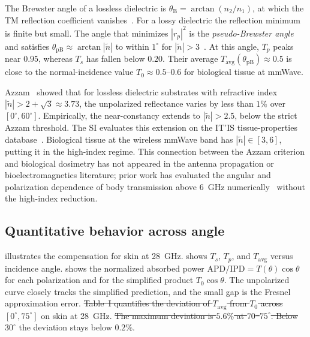 \documentclass[journal,twocolumn,10pt]{IEEEtran}
\newcommand{\IPD}{\mathrm{IPD}}
\newcommand{\APD}{\mathrm{APD}}
\newcommand{\Tavg}{T_{\mathrm{avg}}}
\newcommand{\ntilde}{\tilde{n}}
\providecommand{\DIFaddtex}[1]{{\protect\color{blue}\uwave{#1}}} %
\providecommand{\DIFdeltex}[1]{{\protect\color{red}\sout{#1}}}                      %
\providecommand{\DIFaddbegin}{} %
\providecommand{\DIFaddend}{} %
\providecommand{\DIFdelbegin}{} %
\providecommand{\DIFdelend}{} %
\providecommand{\DIFadd}[1]{\texorpdfstring{\DIFaddtex{#1}}{#1}} %
\providecommand{\DIFdel}[1]{\texorpdfstring{\DIFdeltex{#1}}{}} %
\newcommand{\DIFscaledelfig}{0.5}
\newlength{\DIFdelgraphicswidth} %
\newlength{\DIFdelgraphicsheight} %
\newcommand{\DIFaddincludegraphics}[2][]{{\color{blue}\fbox{\DIFOincludegraphics[#1]{#2}}}} %
\newcommand{\DIFdelincludegraphics}[2][]{%
\sbox{\DIFdelgraphicsbox}{\DIFOincludegraphics[#1]{#2}}%
\settoboxwidth{\DIFdelgraphicswidth}{\DIFdelgraphicsbox} %
\settoboxtotalheight{\DIFdelgraphicsheight}{\DIFdelgraphicsbox} %
\scalebox{\DIFscaledelfig}{%
\parbox[b]{\DIFdelgraphicswidth}{\usebox{\DIFdelgraphicsbox}\\[-\baselineskip] \rule{\DIFdelgraphicswidth}{0em}}\llap{\resizebox{\DIFdelgraphicswidth}{\DIFdelgraphicsheight}{%
\setlength{\unitlength}{\DIFdelgraphicswidth}%
\begin{picture}(1,1)%
\thicklines\linethickness{2pt} %
{\color[rgb]{1,0,0}\put(0,0){\framebox(1,1){}}}%
{\color[rgb]{1,0,0}\put(0,0){\line( 1,1){1}}}%
{\color[rgb]{1,0,0}\put(0,1){\line(1,-1){1}}}%
\end{picture}%
}\hspace*{3pt}}} %
} %
\DeclareRobustCommand{\DIFaddbegin}{\DIFOaddbegin \let\includegraphics\DIFaddincludegraphics} %
\DeclareRobustCommand{\DIFaddend}{\DIFOaddend \let\includegraphics\DIFOincludegraphics} %
\DeclareRobustCommand{\DIFdelbegin}{\DIFOdelbegin \let\includegraphics\DIFdelincludegraphics} %
\DeclareRobustCommand{\DIFdelend}{\DIFOaddend \let\includegraphics\DIFOincludegraphics} %
\begin{document}
The Brewster angle of a lossless dielectric is $\theta_{\mathrm{B}} =
\arctan(n_2/n_1)$, at which the TM reflection coefficient
vanishes~\cite{BornWolf1999}. For a lossy dielectric the reflection
minimum is finite but small. The angle that minimizes $|r_p|^2$ is
the \textit{pseudo-Brewster angle} and satisfies
$\theta_{\mathrm{pB}} \approx \arctan|\ntilde|$ to within $1^\circ$ for
$|\ntilde| > 3$~\cite{Potter1970,Ohman1977}. At this angle, $T_p$
peaks near $0.95$, whereas $T_s$ has fallen below $0.20$. Their
average $\Tavg(\theta_{\mathrm{pB}}) \approx 0.5$ is close to the
normal-incidence value $T_0 \approx 0.5$--$0.6$ for biological
tissue at mmWave.

Azzam~\cite{Azzam2015} showed that for lossless dielectric substrates
with refractive index $|\ntilde| > 2 + \sqrt{3} \approx 3.73$, the
unpolarized reflectance varies by less than $1\%$ over $[0^\circ,
60^\circ]$. Empirically, the near-constancy extends to $|\ntilde| > 2.5$,
below the strict Azzam threshold. The SI evaluates this extension on
the IT'IS tissue-properties database~\cite{ITISv5,Gabriel1996}. Biological tissue at the wireless mmWave
band has $|\ntilde| \in [3, 6]$, putting it in the high-index
regime. This connection between the Azzam criterion and biological dosimetry
has not appeared in the antenna propagation or bioelectromagnetics literature;
prior work has evaluated the angular and polarization
dependence of body transmission above $6$~GHz
numerically~\cite{Samaras2019} without the high-index reduction.

\subsection{Quantitative behavior across angle}\label{subsec:pB-quant}

 illustrates the compensation for skin at
28~GHz.  shows $T_s$, $T_p$, and $\Tavg$ versus
incidence angle.  shows the normalized absorbed power
$\APD/\IPD = T(\theta)\cos\theta$ for each polarization and for the
simplified product $T_0\cos\theta$. The unpolarized curve closely
tracks the simplified prediction, and the small gap is the Fresnel
approximation error. \DIFdelbegin \DIFdel{Table~I quantifies the deviation
of $\Tavg$ from $T_0$ across
$[0^\circ, 75^\circ]$ }\DIFdelend \DIFaddbegin \DIFadd{$\Tavg/T_0$ is at most $1.056$ across
$[0^\circ,90^\circ]$ }\DIFaddend on skin at 28~GHz. \DIFdelbegin \DIFdel{The maximum deviation is $5.6\%$ at $70$--$75^\circ$. Below $30^\circ$
}\DIFdelend \DIFaddbegin \DIFadd{Below $20^\circ$, }\DIFaddend the
deviation stays below $0.2\%$.
\end{document}
